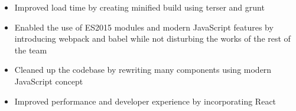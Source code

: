 
\begin{itemize}
  \item Improved load time by creating minified build using terser and grunt
  \item Enabled the use of ES2015 modules and modern JavaScript features by
  introducing webpack and babel while not disturbing the works of the rest of
  the team
  \item Cleaned up the codebase by rewriting many components using modern
  JavaScript concept
  \item Improved performance and developer experience by incorporating React
\end{itemize}

